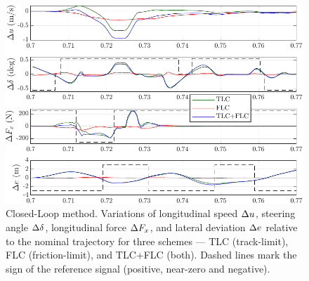 \begin{figure}[t]
	\centering
	\includegraphics{Fig/cl_telemetries.pdf}
	\caption{Closed-Loop method. Variations of longitudinal speed $\Delta u$, steering angle $\Delta\delta$, longitudinal force $\Delta F_x$, and lateral deviation $\Delta e$ relative to the nominal trajectory for three schemes --- TLC (track-limit), FLC (friction-limit), and TLC+FLC (both).
		Dashed lines mark the sign of the reference signal (positive, near-zero and negative).}
	
	\label{fig:cl_telemetries}
\end{figure}
